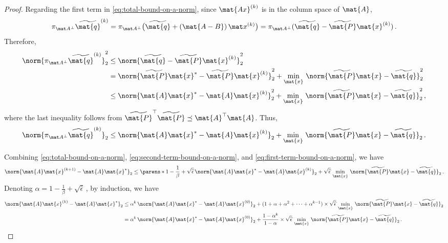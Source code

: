 \begin{proof}
Regarding the first term in \eqref{eq:total-bound-on-a-norm}, since $\mat{Ax}^{(k)}$ is in the column space of $\mat{A}$, %
\[
\pi_{\mat A^\perp}\widetilde{\mat{q}}^{(k)} 
= 
\pi_{\mat A^\perp}\bigl(\widetilde{\mat{q}} +(\mat{A-B})\,\mat x^{(k)}\bigr)
=
\pi_{\mat A^\perp}(\widetilde{\mat{q}} - \widetilde{\mat{P}} \mat{x}^{(k)})\,.
\]
Therefore, %
\begin{align*}
\norm{\pi_{\mat A^\perp}\widetilde{\mat{q}}^{(k)}}_2^2
& \leq 
\norm{\widetilde{\mat{q}} - \widetilde{\mat{P}} \mat{x}^{(k)}}_2^2
\\ & =
\norm{\widetilde{\mat{P}} \mat{x}^{*} - \widetilde{\mat{P}} \mat{x}^{(k)}}_2^2 + \min_{\mat{x}}\, \norm{\widetilde{\mat{P}} \mat{x}-\widetilde{\mat{q}}}_2^2
\\ & \leq 
\norm{\mat{A} \mat{x}^{*} - \mat{A} \mat{x}^{(k)}}_2^2 + \min_{\mat{x}}\, \norm{\widetilde{\mat{P}} \mat{x}-\widetilde{\mat{q}}}_2^2\,,
\end{align*}
where the last inequality follows from $\widetilde{\mat{P}}^\top \widetilde{\mat{P}} \preceq \mat{A}^\top \mat{A}$.
Thus,
\begin{equation}
\label{eq:first-term-bound-on-a-norm}
\norm{\pi_{\mat A^\perp}\widetilde{\mat{q}}^{(k)}}_2
\leq 
\norm{\mat{A} \mat{x}^{*} - \mat{A} \mat{x}^{(k)}}_2 + \min_{\mat{x}}\, \norm{\widetilde{\mat{P}} \mat{x}-\widetilde{\mat{q}}}_2\,.
\end{equation}

Combining \eqref{eq:total-bound-on-a-norm}, \eqref{eq:second-term-bound-on-a-norm}, and \eqref{eq:first-term-bound-on-a-norm}, we have
\[
    \norm{\mat{A}\mat{x}^{(k+1)} - \mat{A}\mat{x}^*}_2
    \leq
    \parens*{1-\frac{1}{\beta} + \sqrt{\widehat{\epsilon}}}\, \norm{\mat{A} \mat{x}^{*} - \mat{A} \mat{x}^{(k)}}_2 + \sqrt{\widehat{\epsilon}}\, \min_{\mat{x}}\, \norm{\widetilde{\mat{P}} \mat{x}-\widetilde{\mat{q}}}_2\,.
\]
Denoting $\alpha=1-\frac{1}{\beta} + \sqrt{\widehat{\epsilon}}\,$, by induction, we have
\begin{align}
\nonumber
\norm{\mat{A}\mat{x}^{(k)} - \mat{A}\mat{x}^*}_2 
& \leq 
\alpha^k\, \norm{\mat{A} \mat{x}^{*} - \mat{A} \mat{x}^{(0)}}_2 + (1+\alpha+\alpha^2 + \cdots + \alpha^{k-1}) \times \sqrt{\widehat{\epsilon}}\,\min_{\mat{x}}\, \norm{\widetilde{\mat{P}} \mat{x}-\widetilde{\mat{q}}}_2
\\ & =
\label{eq:col-space-bound-for-a}
\alpha^k\, \norm{\mat{A} \mat{x}^{*} - \mat{A} \mat{x}^{(0)}}_2 + \frac{1-\alpha^k}{1-\alpha}\times \sqrt{\widehat{\epsilon}}\, \min_{\mat{x}}\, \norm{\widetilde{\mat{P}} \mat{x}-\widetilde{\mat{q}}}_2\,.
\end{align}


\end{proof}
